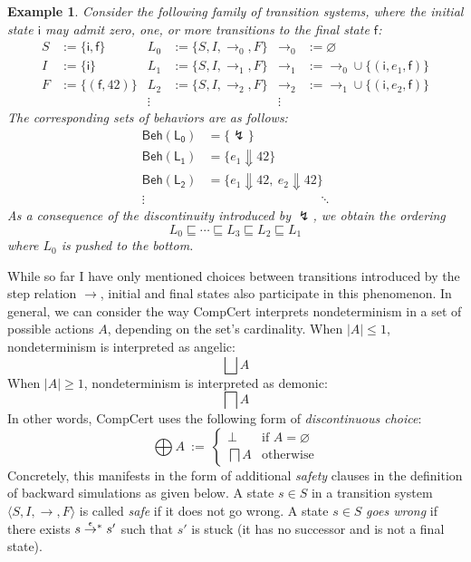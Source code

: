 \documentclass[11pt,oneside]{book}
\newtheorem{example}[theorem]{Example}
\theoremstyle{definition}
\newcommand{\kw}[1]{\ensuremath{ \mathsf{#1} }}
\newcommand{\refby}{\sqsubseteq} %
\begin{document}
\begin{example} %
Consider the following family of transition systems,
where the initial state $\kw{i}$ may admit zero, one, or more
transitions to the final state $\kw{f}$:
\begin{align*}
  S &:= \{ \kw{i}, \kw{f} \} &
  L_0 &:= \{ S, I, {\rightarrow_0}, F \} &
  {\rightarrow_0} &:= \varnothing \\
  I &:= \{ \kw{i} \} &
  L_1 &:= \{ S, I, {\rightarrow_1}, F \} &
  {\rightarrow_1} &:= {\rightarrow_0} \cup
    \{ (\kw{i}, e_1, \kw{f}) \} \\
  F &:= \{ (\kw{f}, 42) \} &
  L_2 &:= \{ S, I, {\rightarrow_2}, F \} &
  {\rightarrow_2} &:= {\rightarrow_1} \cup
    \{ (\kw{i}, e_2, \kw{f}) \} \\
  & & \vdots \: & & \vdots \:\:
\end{align*}
The corresponding sets of behaviors are as follows:
\begin{align*}
  \kw{Beh(L_0)} &= \{ \lightning \} \\
  \kw{Beh(L_1)} &= \{ e_1 \Downarrow 42 \} \\
  \kw{Beh(L_2)} &= \{ e_1 \Downarrow 42, \: e_2 \Downarrow 42 \} \\
  \vdots \quad & \hspace{9em} \ddots
\end{align*}
As a consequence of the discontinuity introduced by $\lightning$,
we obtain the ordering
\[
  L_0 \refby \cdots \refby L_3 \refby L_2 \refby L_1
\]
where $L_0$ is pushed to the bottom.
\end{example}

While so far I have only mentioned
choices between transitions
introduced by the step relation $\rightarrow$,
initial and final states also participate in this phenomenon.
In general,
we can consider the way CompCert interprets nondeterminism
in a set of possible actions $A$,
depending on the set's cardinality.
When $|A| \le 1$, nondeterminism is interpreted as angelic:
\[
  \bigsqcup A
\]
When $|A| \ge 1$, nondeterminism is interpreted as demonic:
\[
  \bigsqcap A
\]
In other words, CompCert uses the following form of
\emph{discontinuous choice}:
\[
  \bigoplus A \: := \:
  \begin{cases}
    \bot & \mbox{if } A = \varnothing \\
    \bigsqcap A & \mbox{otherwise}
  \end{cases}
\]
Concretely, this manifests in the form of additional
\emph{safety} clauses
in the definition of backward simulations
as given below.
A state $s \in S$
in a transition system $\langle S, I, {\rightarrow}, F \rangle$
is called \emph{safe}
if it does not go wrong.
A state $s \in S$
\emph{goes wrong} if there exists
$s \mathrel{\smash{\stackrel{\epsilon}{\rightarrow}}^*} s'$
such that $s'$ is stuck
(it has no successor and is not a final state).
\end{document}
